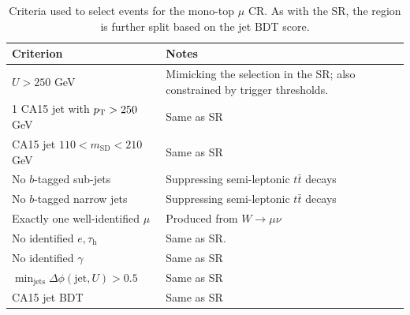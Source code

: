 \begin{table}[]
    \caption{Criteria used to select events for the mono-top $\mu$ CR. As with the SR, the region is further split based on the jet BDT score.}
    \label{tab:mt:wmn_cuts}
    \centering
    \begin{tabular}{p{}p{}}
        Criterion & Notes \\ 
        \hline 
        \hline 
        $U>250$ GeV & Mimicking the selection in the SR; also constrained by trigger thresholds. \\ 
        1 CA15 jet with $p_\mathrm{T}>250$ GeV &  Same as SR \\ 
        CA15 jet $110 < m_\mathrm{SD} < 210$ GeV & Same as SR \\ 
        No $b$-tagged sub-jets & Suppressing semi-leptonic $t\bar{t}$ decays \\ 
        No $b$-tagged narrow jets & Suppressing semi-leptonic $t\bar{t}$ decays \\ 
        \hline 
        Exactly one well-identified $\mu$ & Produced from $W\rightarrow\mu\nu$ \\ 
        No identified $e,\tau_\mathrm{h}$ & Same as SR. \\ 
        No identified $\gamma$ & Same as SR \\ 
        \hline 
        $\min_\mathrm{jets}\Delta\phi(\mathrm{jet},U) > 0.5$ & Same as SR \\ 
        \hline 
        CA15 jet BDT & Same as SR\\ 
    \end{tabular}
\end{table}

